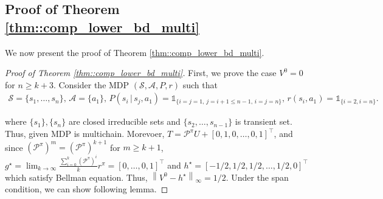 \documentclass{article} %
\newcommand{\cA}{\mathcal{A}}
\newcommand{\cS}{\mathcal{S}}
\newcommand{\cP}{\mathcal{P}}
\newcommand*{\para}[1]{\left({#1}\right)}
\newcommand*{\infn}[1]{\left\|{#1}\right\|_{\infty}}
\begin{document}
\subsection{Proof of Theorem \ref{thm::comp_lower_bd_multi}}
We now present the proof of Theorem \ref{thm::comp_lower_bd_multi}.
\begin{proof}[Proof of Theorem \ref{thm::comp_lower_bd_multi}]
First, we prove the case $V^0=0$ for $n\ge k+3$. Consider the MDP $(\cS, \cA, P, r)$ such that  
\begin{align*}
        \cS=\{s_1,\dots, s_{n}\}, \, \cA=\{a_1\}, \, P(s_i\,|\,s_j,a_1)=\mathds{1}_{\{i=j=1, \,j=i+1 \le n-1, \, i=j=n\}}, \, r(s_i, a_1)=\mathds{1}_{\{i=2, i=n\}}.
\end{align*}

where $\{s_1\}, \{s_n\}$ are closed irreducible sets and $\{s_2, \dots, s_{n-1}\}$ is transient set.  Thus, given MDP is multichain. Morevoer, $T= \cP^{\pi}U+[0,1, 0, \dots, 0, 1]^{\intercal}$, and since $(\cP^{\pi})^m= (\cP^{\pi})^{k+1}$ for $m \ge k+1$, $g^{\star}= \lim_{k \rightarrow \infty}\frac{\sum^k_{i=0}\para{\cP^{\pi}}^i}{k}r^{\pi}=[0, \dots, 0, 1]^{\intercal}$ and $h^{\star} = [-1/2,1/2,1/2, \dots, 1/2, 0]^{\intercal}$ which satisfy Bellman equation. Thus, $\infn{V^0-h^{\star}}=1/2$. Under the span condition, we can show following lemma.


\end{proof}
\end{document}
